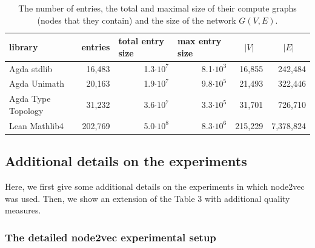 \documentclass{article}
\begin{document}
\begin{table}[htbp]
  \centering
  \caption{The number of entries, the total and maximal size of their compute graphs (nodes that they contain) and the size of the network $G(V, E)$.}
    \begin{tabular}{l|rrr|rr}
    library & \multicolumn{1}{l}{entries} & \multicolumn{1}{l}{total entry size} & \multicolumn{1}{l|}{max entry size} & \multicolumn{1}{c}{$|V|$} & \multicolumn{1}{c}{$|E|$}\\
    \hline
    Agda stdlib & 16,483 & 1.3$\cdot 10^7$ & 8.1$\cdot 10^3$ & 16,855 & 242,484 \\
    Agda Unimath & 20,163 & 1.9$\cdot 10^7$ & 9.8$\cdot 10^5$ & 21,493 & 322,446 \\
    Agda Type Topology & 31,232 & 3.6$\cdot 10^7$ & 3.3$\cdot 10^5$ & 31,701 & 726,710 \\
    Lean Mathlib4 & 202,769 & 5.0$\cdot 10^8$ & 8.3$\cdot 10^6$ & 215,229 & 7,378,824 \\
    \end{tabular}%
  \label{tab:data-size}%
\end{table}%

\subsection{Additional details on the experiments}

Here, we first give some additional details on the experiments in which node2vec was used. Then, we show an extension of the Table 3 with additional quality measures.

\subsubsection{The detailed node2vec experimental setup}
\end{document}
